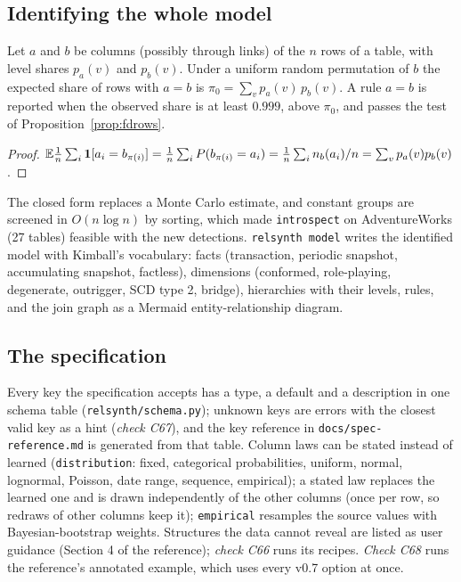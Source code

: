 \subsection{Identifying the whole model}
\begin{proposition}\label{prop:eqlink}
Let $a$ and $b$ be columns (possibly through links) of the $n$ rows of a table, with level shares $p_a(v)$ and $p_b(v)$. Under a uniform random permutation of $b$ the expected share of rows with $a=b$ is $\pi_0=\sum_v p_a(v)\,p_b(v)$. A rule $a=b$ is reported when the observed share is at least $0.999$, above $\pi_0$, and passes the test of Proposition~\ref{prop:fdrows}.
\end{proposition}
\begin{proof}
$\mathbb{E}\frac1n\sum_i\mathbf 1[a_i=b_{\pi(i)}]=\frac1n\sum_i P(b_{\pi(i)}=a_i)=\frac1n\sum_i n_b(a_i)/n=\sum_v p_a(v)p_b(v)$.
\end{proof}
\noindent The closed form replaces a Monte Carlo estimate, and constant groups are screened in $O(n\log n)$ by sorting, which made \texttt{introspect} on AdventureWorks (27 tables) feasible with the new detections. \texttt{relsynth model} writes the identified model with Kimball's vocabulary: facts (transaction, periodic snapshot, accumulating snapshot, factless), dimensions (conformed, role-playing, degenerate, outrigger, SCD type 2, bridge), hierarchies with their levels, rules, and the join graph as a Mermaid entity-relationship diagram.

\subsection{The specification}
Every key the specification accepts has a type, a default and a description in one schema table (\texttt{relsynth/schema.py}); unknown keys are errors with the closest valid key as a hint (\emph{check C67}), and the key reference in \texttt{docs/spec-reference.md} is generated from that table. Column laws can be stated instead of learned (\texttt{distribution}: fixed, categorical probabilities, uniform, normal, lognormal, Poisson, date range, sequence, empirical); a stated law replaces the learned one and is drawn independently of the other columns (once per row, so redraws of other columns keep it); \texttt{empirical} resamples the source values with Bayesian-bootstrap weights. Structures the data cannot reveal are listed as user guidance (Section 4 of the reference); \emph{check C66} runs its recipes. \emph{Check C68} runs the reference's annotated example, which uses every v0.7 option at once.

